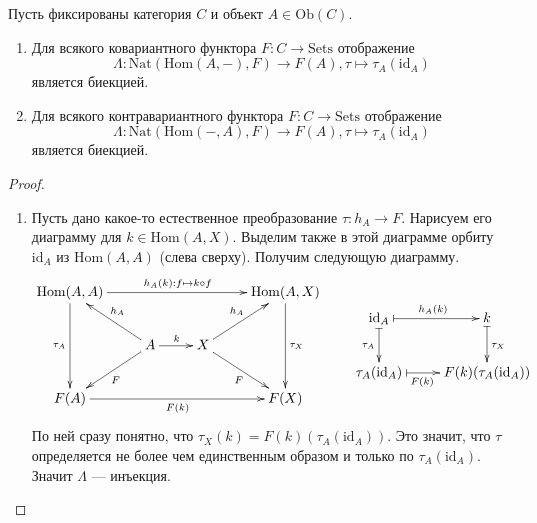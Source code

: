 \documentclass[12pt,a4paper]{article}
\newcommand{\Hom}{\mathrm{Hom}}
\newcommand{\Ob}{\mathrm{Ob}}
\newcommand{\id}{\mathrm{id}}
\newcommand{\Sets}{\mathrm{Sets}}
\newcommand{\Nat}{\mathrm{Nat}}
\begin{document}
    \begin{lemma}
        Пусть фиксированы категория $C$ и объект $A \in \Ob(C)$.
        \begin{enumerate}
            \item Для всякого ковариантного функтора $F: C \to \Sets$ отображение
                \[\Lambda: \Nat(\Hom(A, {-}), F) \to F(A), \tau \mapsto \tau_A(\id_A)\]
                является биекцией.
            \item Для всякого контравариантного функтора $F: C \to \Sets$ отображение
                \[\Lambda: \Nat(\Hom({-}, A), F) \to F(A), \tau \mapsto \tau_A(\id_A)\]
                является биекцией.
        \end{enumerate}
    \end{lemma}

    \begin{proof}
        \begin{enumerate}
            \item Пусть дано какое-то естественное преобразование $\tau: h_A \to F$. Нарисуем его диаграмму для $k \in \Hom(A, X)$. Выделим также в этой диаграмме орбиту $\id_A$ из $\Hom(A, A)$ (слева сверху). Получим следующую диаграмму.
                \[
                    \vcenter{
                        \xymatrix{
                            \Hom(A, A) \ar[rrr]^{h_A(k): f \mapsto k \circ f} \ar[dd]_{\tau_A}&&& \Hom(A, X) \ar[dd]^{\tau_X}\\
                            & A \ar[r]^{k} \ar[lu]_{h_A} \ar[ld]^{F}& X \ar[ru]^{h_A} \ar[rd]_{F}&\\
                            F(A) \ar[rrr]_{F(k)}&&& F(X)
                        }
                    }
                    \qquad
                    \vcenter{
                        \xymatrix{
                            \id_A \ar@{|->}[r]^{h_A(k)} \ar@{|->}[d]_{\tau_A}& k \ar@{|->}[d]^{\tau_X}\\
                            \tau_A(\id_A) \ar@{|->}[r]_(0.4){F(k)}& F(k)(\tau_A(\id_A))
                        }
                    }
                \]
                По ней сразу понятно, что $\tau_X(k) = F(k)(\tau_A(\id_A))$. Это значит, что $\tau$ определяется не более чем единственным образом и только по $\tau_A(\id_A)$. Значит $\Lambda$ --- инъекция.
        

\end{enumerate}
\end{proof}
\end{document}
